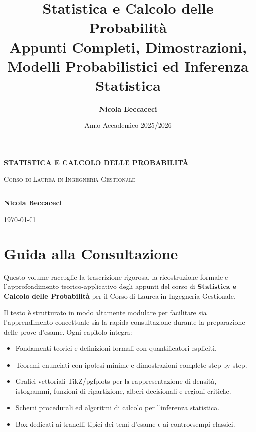 \documentclass[11pt,a4paper,twoside,openright]{book}
\title{\Huge\textbf{\textsf{Statistica e Calcolo delle Probabilità}}\\[0.5em]
\Large\textsf{Appunti Completi, Dimostrazioni, Modelli Probabilistici ed Inferenza Statistica}}
\author{\textbf{\textsf{Nicola Beccaceci}}}
\date{\textsf{Anno Accademico 2025/2026}}
\begin{document}
\frontmatter
\begin{titlepage}
    \centering
    \vspace*{2cm}
    {\Huge\bfseries\color{navyblue} STATISTICA E CALCOLO DELLE PROBABILITÀ\par}
    \vspace{1cm}
    {\Large\scshape Corso di Laurea in Ingegneria Gestionale\par}
    \vfill
    \rule{0.6\textwidth}{1pt}\par
    \vspace{1cm}
    {\large\textbf{\underline{Nicola Beccaceci}}\par}
    \vspace{0.5cm}
    {\small \today\par}
    \vspace*{2cm}
\end{titlepage}

\tableofcontents
\cleardoublepage

\chapter*{Guida alla Consultazione}
Questo volume raccoglie la trascrizione rigorosa, la ricostruzione formale e l'approfondimento teorico-applicativo degli appunti del corso di \textbf{Statistica e Calcolo delle Probabilità} per il Corso di Laurea in Ingegneria Gestionale.

Il testo è strutturato in modo altamente modulare per facilitare sia l'apprendimento concettuale sia la rapida consultazione durante la preparazione delle prove d'esame. Ogni capitolo integra:
\begin{itemize}
    \item Fondamenti teorici e definizioni formali con quantificatori espliciti.
    \item Teoremi enunciati con ipotesi minime e dimostrazioni complete step-by-step.
    \item Grafici vettoriali TikZ/pgfplots per la rappresentazione di densità, istogrammi, funzioni di ripartizione, alberi decisionali e regioni critiche.
    \item Schemi procedurali ed algoritmi di calcolo per l'inferenza statistica.
    \item Box dedicati ai tranelli tipici dei temi d'esame e ai controesempi classici.
\end{itemize}
\end{document}
